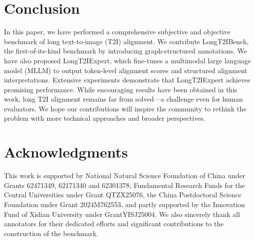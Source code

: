 \documentclass[letterpaper]{article} %
\begin{document}
\section{Conclusion}
In this paper, we have performed a comprehensive subjective and objective benchmark of long text-to-image (T2I) alignment. We contribute LongT2IBench, the first-of-its-kind benchmark by introducing graph-structured annotations. We have also proposed LongT2IExpert, which fine-tunes a multimodal large language model (MLLM) to output token-level alignment scores and structured alignment interpretations. Extensive experiments demonstrate that LongT2IExpert achieves promising performance. While encouraging results have been obtained in this work, long T2I alignment remains far from solved—a challenge even for human evaluators. We hope our contributions will inspire the community to rethink the problem with more technical approaches and broader perspectives.


\section{Acknowledgments}
This work is supported by National Natural Science Foundation of China under Grants 62471349, 62171340 and 62301378,  Fundamental Research Funds for the Central Universities under Grant QTZX25076, the China Postdoctoral Science Foundation under Grant 2024M762553, and partly supported by the Innovation Fund of Xidian University under GrantYISJ25004. We also sincerely thank all annotators for their dedicated efforts and significant contributions to the construction of the benchmark.


\end{document}
